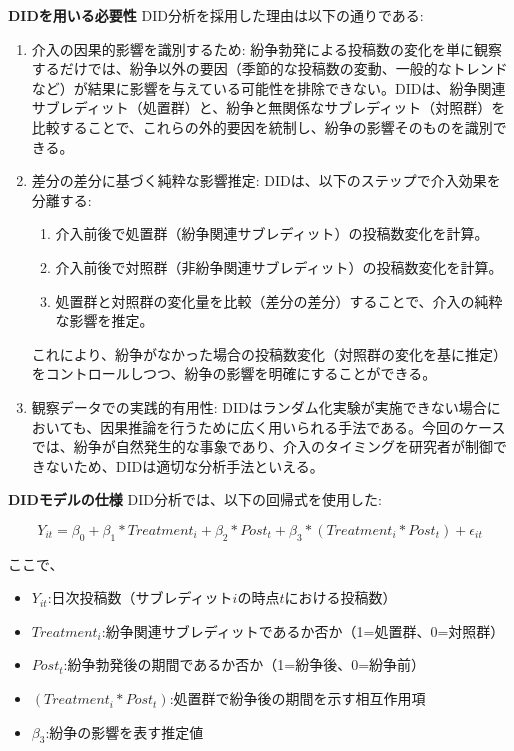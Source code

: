 \documentclass[11pt, a4j]{jreport}
\begin{document}
    \textbf{DIDを用いる必要性}
    DID分析を採用した理由は以下の通りである:
    \begin{enumerate}
        \item 介入の因果的影響を識別するため: 紛争勃発による投稿数の変化を単に観察するだけでは、紛争以外の要因（季節的な投稿数の変動、一般的なトレンドなど）が結果に影響を与えている可能性を排除できない。DIDは、紛争関連サブレディット（処置群）と、紛争と無関係なサブレディット（対照群）を比較することで、これらの外的要因を統制し、紛争の影響そのものを識別できる。
        \item 差分の差分に基づく純粋な影響推定: DIDは、以下のステップで介入効果を分離する:
            \begin{enumerate}
                \item 介入前後で処置群（紛争関連サブレディット）の投稿数変化を計算。
                \item 介入前後で対照群（非紛争関連サブレディット）の投稿数変化を計算。
                \item 処置群と対照群の変化量を比較（差分の差分）することで、介入の純粋な影響を推定。
            \end{enumerate}
            これにより、紛争がなかった場合の投稿数変化（対照群の変化を基に推定）をコントロールしつつ、紛争の影響を明確にすることができる。
        \item 観察データでの実践的有用性: DIDはランダム化実験が実施できない場合においても、因果推論を行うために広く用いられる手法である。今回のケースでは、紛争が自然発生的な事象であり、介入のタイミングを研究者が制御できないため、DIDは適切な分析手法といえる。
    \end{enumerate}
    \textbf{DIDモデルの仕様}
    DID分析では、以下の回帰式を使用した:

    \begin{equation}
        Y_{it} = \beta_{0} + \beta_{1}*Treatment_{i} + \beta_{2}*Post_{t} + \beta_{3}*(Treatment_{i} * Post_{t}) + \epsilon_{it}
    \end{equation}

    ここで、
    \begin{itemize}
        \item $Y_{it}$:日次投稿数（サブレディット$i$の時点$t$における投稿数）
        \item $Treatment_{i}$:紛争関連サブレディットであるか否か（1=処置群、0=対照群）
        \item $Post_{t}$:紛争勃発後の期間であるか否か（1=紛争後、0=紛争前）
        \item $(Treatment_{i} * Post_{t})$:処置群で紛争後の期間を示す相互作用項
        \item $\beta_{3}$:紛争の影響を表す推定値
    \end{itemize}
\end{document}
